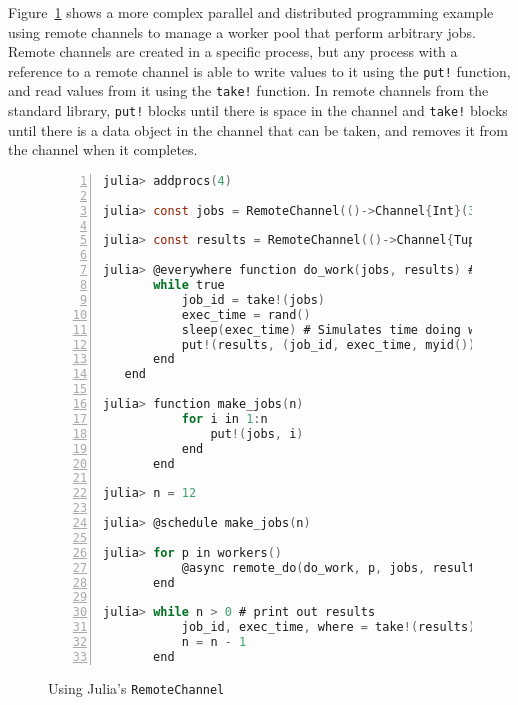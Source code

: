Figure~\ref{fig:remotechannel_example} shows a more complex parallel and
distributed programming example using remote channels to manage a worker pool
that perform arbitrary jobs. Remote channels are created in a specific process,
but any process with a reference to a remote channel is able to write values to
it using the \texttt{put!} function, and read values from it using the
\texttt{take!} function. In remote channels from the standard library,
\texttt{put!} blocks until there is space in the channel and \texttt{take!}
blocks until there is a data object in the channel that can be taken, and
removes it from the channel when it completes.

\begin{figure}[htpb]
    \begin{minipage}{\linewidth}
    \begin{lstlisting}[language=C, basicstyle=\ttfamily\scriptsize,
        numbers=left,
        frame=no, showspaces=false, showstringspaces=false,
        numberstyle=\scriptsize,
        xleftmargin=1.5cm,
        keywords={%
            @spawnat, remotecall, Nullable, Any,
            fetch, Future, Array, Float64, julia,
            while, true, function, end, put!,
            take!, sleep, RemoteChannel, Channel,
            Int, Tuple, const, addprocs, @schedule,
            @everywhere, for, in, myid, @async,
            remote_do, workers%
        },
        otherkeywords={::, \&, \*, +, -, /, [, ], >, <, put!, take!}
    ]
julia> addprocs(4)

julia> const jobs = RemoteChannel(()->Channel{Int}(32))

julia> const results = RemoteChannel(()->Channel{Tuple}(32))

julia> @everywhere function do_work(jobs, results) # Defines method everywhere
       while true
           job_id = take!(jobs)
           exec_time = rand()
           sleep(exec_time) # Simulates time doing work
           put!(results, (job_id, exec_time, myid()))
       end
   end

julia> function make_jobs(n)
           for i in 1:n
               put!(jobs, i)
           end
       end

julia> n = 12

julia> @schedule make_jobs(n)

julia> for p in workers()
           @async remote_do(do_work, p, jobs, results)
       end

julia> while n > 0 # print out results
           job_id, exec_time, where = take!(results)
           n = n - 1
       end
    \end{lstlisting}
    \end{minipage}
    \caption{Using Julia's \texttt{RemoteChannel}}
    \label{fig:remotechannel_example}
\end{figure}

